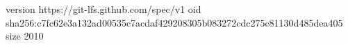version https://git-lfs.github.com/spec/v1
oid sha256:c7fc62e3a132ad00535c7acdaf429208305b083272cdc275c81130d485dea405
size 2010
